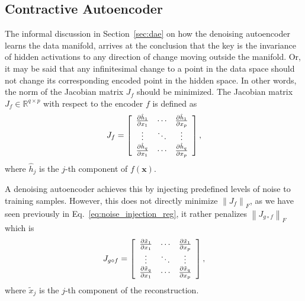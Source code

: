 \documentclass{now}
\newcommand{\vect}[1]{\mathbf{#1}}
\newcommand{\vx}[0]{\vect{x}}
\newcommand{\RR}[0]{\mathbb{R}}
\begin{document}
\subsection{Contractive Autoencoder}

The informal discussion in Section~\ref{sec:dae} on how the denoising
autoencoder learns the data manifold, arrives at the conclusion that the key is
the invariance of hidden activations to any direction of change moving outside
the manifold. Or, it may be said that any infinitesimal change to a point in the
data space should not change its corresponding encoded point in the hidden
space.  In other words, the norm of the Jacobian matrix $J_f$ should be
minimized. The Jacobian matrix $J_f \in \RR^{q \times p}$ with respect to the
encoder $f$ is defined as
\begin{align}
    \label{eq:jacob_f}
    J_f = \left[ 
    \begin{array}{c c c}
        \frac{\partial \hat{h}_1}{\partial x_1} & \cdots &
        \frac{\partial \hat{h}_1}{\partial x_p} \\
        \vdots & \ddots & \vdots \\
        \frac{\partial \hat{h}_q}{\partial x_1} & \cdots & \frac{\partial \hat{h}_q}{\partial x_p}
    \end{array}
    \right],
\end{align}
where $\hat{h}_j$ is the $j$-th component of $f(\vx)$.

A denoising autoencoder achieves this by injecting predefined levels of noise to
training samples. However, this does not directly minimize $\left\| J_f
\right\|_F$, as we have seen previously in Eq.~\eqref{eq:noise_injection_reg},
it rather penalizes $\left\| J_{g \circ f} \right\|_F$ which is 
\begin{align*}
    J_{g \circ f} = \left[ 
    \begin{array}{c c c}
        \frac{\partial \tilde{x}_1}{\partial x_1} & \cdots &
        \frac{\partial \tilde{x}_1}{\partial x_p} \\
        \vdots & \ddots & \vdots \\
        \frac{\partial \tilde{x}_q}{\partial x_1} & \cdots &
        \frac{\partial \tilde{x}_q}{\partial x_p}
    \end{array}
    \right],
\end{align*}
where $\tilde{x}_j$ is the $j$-th component of the reconstruction.
\end{document}
